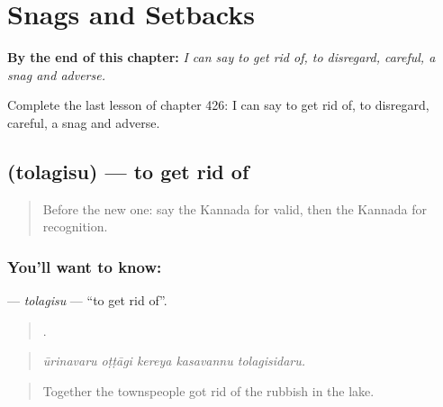 
\chapter{Snags and Setbacks}
\label{ch:ka-snags-and-setbacks}

\begin{chapteropening}
\textbf{By the end of this chapter:} \emph{I can say to get rid of, to disregard, careful, a snag and adverse.}

Complete the last lesson of chapter 426: I can say to get rid of, to disregard, careful, a snag and adverse.
\end{chapteropening}

\section[\texorpdfstring{\kn{ತೊಲಗಿಸು} (tolagisu)}{ತೊಲಗಿಸು (tolagisu)}]{ (tolagisu) — to get rid of}

\label{lesson:KA-C426-tolagisu}



\begin{quote}
Before the new one: say the Kannada for valid, then the Kannada for recognition.
\end{quote}

\subsection*{You'll want to know: }
\textbf{} — \emph{tolagisu} — \textquotedblleft{}to get rid of\textquotedblright{}.

\begin{quote}
    .
\end{quote}

\begin{quote}
\emph{ūrinavaru oṭṭāgi kereya kasavannu tolagisidaru.}
\end{quote}

\begin{quote}
Together the townspeople got rid of the rubbish in the lake.
\end{quote}

